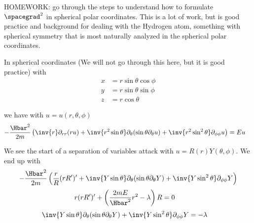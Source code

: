 %
%
HOMEWORK: go through the steps to understand how to formulate \(\spacegrad^2\) in spherical polar coordinates.  This is a lot of work, but is good practice and background for dealing with the Hydrogen atom, something with spherical symmetry that is most naturally analyzed in the spherical polar coordinates.

In spherical coordinates (We will not go through this here, but it is good practice) with
%
\begin{equation}\label{eqn:lecture5BigReviewAngularMomentum:5020}
\begin{aligned}
x &= r \sin\theta \cos\phi \\
y &= r \sin\theta \sin\phi \\
z &= r \cos\theta
\end{aligned}
\end{equation}

we have with \(u = u(r,\theta, \phi)\)
%
\begin{equation}\label{eqn:lecture5BigReviewAngularMomentum:5040}
\begin{aligned}
-\frac{\Hbar^2}{2m} \left(
\inv{r} \partial_{rr} (r u) +  \inv{r^2 \sin\theta} \partial_\theta (\sin\theta \partial_\theta u)
+ \inv{r^2 \sin^2\theta} \partial_{\phi\phi} u
 \right)
&= E u
\end{aligned}
\end{equation}

We see the start of a separation of variables attack with \(u = R(r) Y(\theta, \phi)\).  We end up with
%
\begin{equation}\label{eqn:lecture5BigReviewAngularMomentum:5060}
\begin{aligned}
-\frac{\Hbar^2}{2m} &\left(
\frac{r}{R} (r R')' +  \inv{Y \sin\theta} \partial_\theta (\sin\theta \partial_\theta Y)
+ \inv{Y \sin^2\theta} \partial_{\phi\phi} Y
 \right) \\
\end{aligned}
\end{equation}
%
\begin{equation}\label{eqn:lecture5BigReviewAngularMomentum:5080}
\begin{aligned}
r (r R')' + \left( \frac{2m E}{\Hbar^2} r^2 - \lambda \right) R &= 0
\end{aligned}
\end{equation}
\begin{equation}\label{eqn:lecture5BigReviewAngularMomentum:5100}
\begin{aligned}
\inv{Y \sin\theta} \partial_\theta (\sin\theta \partial_\theta Y) + \inv{Y \sin^2\theta} \partial_{\phi\phi} Y &= -\lambda
\end{aligned}
\end{equation}

